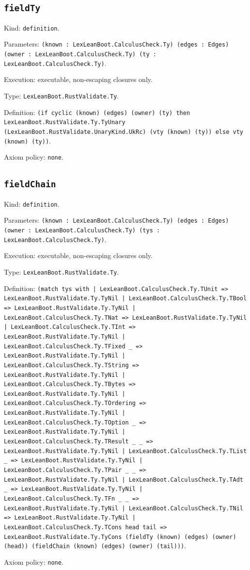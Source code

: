 \documentclass[11pt]{article}
\begin{document}
\subsection*{\texttt{fieldTy}}
\noindent Kind: \texttt{definition}.\par
\noindent Parameters: \texttt{(known : LexLeanBoot.CalculusCheck.Ty) (edges : Edges) (owner : LexLeanBoot.CalculusCheck.Ty) (ty : LexLeanBoot.CalculusCheck.Ty)}.\par
\noindent Execution: executable, non-escaping closures only.\par
\noindent Type: \texttt{LexLeanBoot.RustValidate.Ty}.\par
\noindent Definition: \texttt{(if cyclic (known) (edges) (owner) (ty) then LexLeanBoot.RustValidate.Ty.TyUnary (LexLeanBoot.RustValidate.UnaryKind.UkRc) (vty (known) (ty)) else vty (known) (ty))}.\par
\noindent Axiom policy: \texttt{none}.\par
\subsection*{\texttt{fieldChain}}
\noindent Kind: \texttt{definition}.\par
\noindent Parameters: \texttt{(known : LexLeanBoot.CalculusCheck.Ty) (edges : Edges) (owner : LexLeanBoot.CalculusCheck.Ty) (tys : LexLeanBoot.CalculusCheck.Ty)}.\par
\noindent Execution: executable, non-escaping closures only.\par
\noindent Type: \texttt{LexLeanBoot.RustValidate.Ty}.\par
\noindent Definition: \texttt{(match tys with | LexLeanBoot.CalculusCheck.Ty.TUnit => LexLeanBoot.RustValidate.Ty.TyNil | LexLeanBoot.CalculusCheck.Ty.TBool => LexLeanBoot.RustValidate.Ty.TyNil | LexLeanBoot.CalculusCheck.Ty.TNat => LexLeanBoot.RustValidate.Ty.TyNil | LexLeanBoot.CalculusCheck.Ty.TInt => LexLeanBoot.RustValidate.Ty.TyNil | LexLeanBoot.CalculusCheck.Ty.TFixed \_ => LexLeanBoot.RustValidate.Ty.TyNil | LexLeanBoot.CalculusCheck.Ty.TString => LexLeanBoot.RustValidate.Ty.TyNil | LexLeanBoot.CalculusCheck.Ty.TBytes => LexLeanBoot.RustValidate.Ty.TyNil | LexLeanBoot.CalculusCheck.Ty.TOrdering => LexLeanBoot.RustValidate.Ty.TyNil | LexLeanBoot.CalculusCheck.Ty.TOption \_ => LexLeanBoot.RustValidate.Ty.TyNil | LexLeanBoot.CalculusCheck.Ty.TResult \_ \_ => LexLeanBoot.RustValidate.Ty.TyNil | LexLeanBoot.CalculusCheck.Ty.TList \_ => LexLeanBoot.RustValidate.Ty.TyNil | LexLeanBoot.CalculusCheck.Ty.TPair \_ \_ => LexLeanBoot.RustValidate.Ty.TyNil | LexLeanBoot.CalculusCheck.Ty.TAdt \_ => LexLeanBoot.RustValidate.Ty.TyNil | LexLeanBoot.CalculusCheck.Ty.TFn \_ \_ => LexLeanBoot.RustValidate.Ty.TyNil | LexLeanBoot.CalculusCheck.Ty.TNil => LexLeanBoot.RustValidate.Ty.TyNil | LexLeanBoot.CalculusCheck.Ty.TCons head tail => LexLeanBoot.RustValidate.Ty.TyCons (fieldTy (known) (edges) (owner) (head)) (fieldChain (known) (edges) (owner) (tail)))}.\par
\noindent Axiom policy: \texttt{none}.\par
\end{document}

